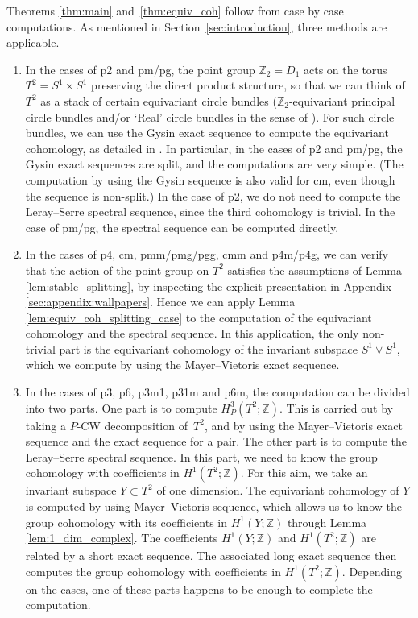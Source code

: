 \documentclass[pdftex]{sigma}
\theoremstyle{definition}
\newcommand{\Z}{\mathbb{Z}}
\begin{document}
Theorems \ref{thm:main} and~\ref{thm:equiv_coh} follow from case by case computations. As mentioned in Section~\ref{sec:introduction}, three methods are applicable.
\begin{enumerate}\itemsep=0pt
\item In the cases of \textsf{p2} and \textsf{pm/pg}, the point group $\Z_2 = D_1$ acts on the torus \mbox{$T^2 = S^1 \times S^1$} preserving the direct product structure, so that we can think of $T^2$ as a stack of certain equivariant circle bundles ($\Z_2$-equivariant principal circle bundles and/or `Real' circle bundles in the sense of \cite{G}). For such circle bundles, we can use the Gysin exact sequence to compute the equivariant cohomology, as detailed in \cite{G}. In particular, in the cases of \textsf{p2} and \textsf{pm/pg}, the Gysin exact sequences are split, and the computations are very simple. (The computation by using the Gysin sequence is also valid for \textsf{cm}, even though the sequence is non-split.) In the case of \textsf{p2}, we do not need to compute the Leray--Serre spectral sequence, since the third cohomology is trivial. In the case of \textsf{pm/pg}, the spectral sequence can be computed directly.

\item In the cases of \textsf{p4}, \textsf{cm}, \textsf{pmm/pmg/pgg}, \textsf{cmm} and \textsf{p4m/p4g}, we can verify that the action of the point group on $T^2$ satisf\/ies the assumptions of Lemma \ref{lem:stable_splitting}, by inspecting the explicit presentation in Appendix \ref{sec:appendix:wallpapers}. Hence we can apply Lemma \ref{lem:equiv_coh_splitting_case} to the computation of the equivariant cohomology and the spectral sequence. In this application, the only non-trivial part is the equivariant cohomology of the invariant subspace $S^1 \vee S^1$, which we compute by using the Mayer--Vietoris exact sequence.

\item In the cases of \textsf{p3}, \textsf{p6}, \textsf{p3m1}, \textsf{p31m} and \textsf{p6m}, the computation can be divided into two parts. One part is to compute $H^3_P(T^2; \Z)$. This is carried out by taking a $P$-CW decomposition of~$T^2$, and by using the Mayer--Vietoris exact sequence and the exact sequence for a pair. The other part is to compute the Leray--Serre spectral sequence. In this part, we need to know the group cohomology with coef\/f\/icients in $H^1(T^2; \Z)$. For this aim, we take an invariant subspace $Y \subset T^2$ of one dimension. The equivariant cohomology of $Y$ is computed by using Mayer--Vietoris sequence, which allows us to know the group cohomology with its coef\/f\/icients in $H^1(Y; \Z)$ through Lemma \ref{lem:1_dim_complex}. The coef\/f\/icients $H^1(Y; \Z)$ and $H^1(T^2; \Z)$ are related by a short exact sequence. The associated long exact sequence then computes the group cohomology with coef\/f\/icients in $H^1(T^2; \Z)$. Depending on the cases, one of these parts happens to be enough to complete the computation.
\end{enumerate}
\end{document}
